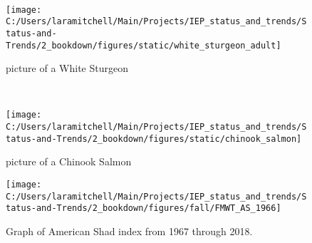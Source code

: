 \documentclass[
]{book}
\begin{document}
\begin{panel-grid}
\begin{columns-nocenter}
\begin{column40}
~

\end{column40}

\begin{column800}

\begin{figure}

{\centering \texttt{[image: C:/Users/laramitchell/Main/Projects/IEP\_status\_and\_trends/Status-and-Trends/2\_bookdown/figures/static/white\_sturgeon\_adult]} 

}

\caption{picture of a White Sturgeon}\label{fig:unnamed-chunk-128}
\end{figure}

\end{column800}

\begin{column40}

~

\end{column40}

\begin{column800}

\begin{figure}

{\centering \texttt{[image: C:/Users/laramitchell/Main/Projects/IEP\_status\_and\_trends/Status-and-Trends/2\_bookdown/figures/static/chinook\_salmon]} 

}

\caption{picture of a Chinook Salmon}\label{fig:unnamed-chunk-129}
\end{figure}

\end{column800}

\end{columns-nocenter}

\begin{columns-nocenter}

\begin{column800}

\begin{expand}

\begin{figure}
\texttt{[image: C:/Users/laramitchell/Main/Projects/IEP\_status\_and\_trends/Status-and-Trends/2\_bookdown/figures/fall/FMWT\_AS\_1966]} \caption{Graph of American Shad index from 1967 through 2018.}\label{fig:unnamed-chunk-130}
\end{figure}

\end{expand}


\end{column800}
\end{columns-nocenter}
\end{panel-grid}
\end{document}
